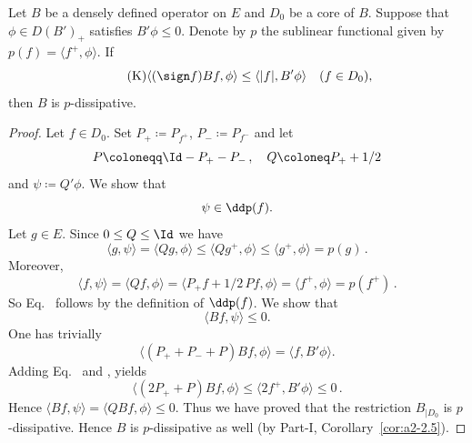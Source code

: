\begin{proposition}\label{prop:c2-3.10}
Let $B$ be a densely defined operator on $E$ and $D_{0}$ be a core of\/ $B$.
Suppose that $\phi \in D(B')_{+}$ satisfies $B'\phi \leq 0$.
Denote by $p$ the sublinear functional given by $p(f) = \langle f^{+},\phi \rangle$. 
If
\begin{equation*}\label{eq:c2-K6} \tag{K}
	\langle(\sign f) Bf,\phi \rangle \leq \langle|f|,B'\phi\rangle \quad (f \in D_{0}),
\end{equation*}
then $B$ is $p$-dissipative.
\end{proposition}
\begin{proof}
Let $f \in D_{0}$. 
Set $P_{+} \coloneqq P_{f^{+}}$, $P_{-} \coloneqq P_{f^{-}}$ and let
\[
P \coloneqq \Id - P_{+} - P_{-}\,, \quad Q \coloneq P_{+} + 1/2
\]
and $\psi \coloneq Q'\phi$. We show that
\begin{equation}\label{eq:c2-3.2}
\psi \in \ddp(f).
\end{equation}
Let $g \in E$. 
Since $0 \leq Q \leq \Id$ we have 
\[
\langle g,\psi \rangle = \langle Qg,\phi \rangle \leq \langle Qg^{+},\phi \rangle \leq
\langle g^{+},\phi \rangle = p(g)\,.
\]
Moreover, 
\[\langle f, \psi \rangle = \langle Qf,\phi \rangle = \langle P_{+}f + 1/2 \, Pf,\phi \rangle = \langle f^{+},\phi \rangle = p(f^{+})\,.
\]
So Eq.~ follows by the definition of\/ $\ddp(f)$. 
We show that
\begin{equation}\label{eq:c2-3.3}
\langle Bf,\psi \rangle \leq 0.
\end{equation}
One has trivially
\begin{equation}\label{eq:c2-3.4}
\langle(P_{+} + P_{-} + P) Bf,\phi \rangle = \langle f,B'\phi \rangle.
\end{equation}
Adding Eq.~ and ,  yields
\[
\langle(2P_{+} + P)Bf,\phi \rangle \leq \langle 2f^{+},B'\phi \rangle \leq 0\,.
\]
Hence $\langle Bf,\psi \rangle = \langle QBf,\phi \rangle \leq 0$.
Thus we have proved that the restriction  $B_{|D_{0}}$ is $p$-dissipative. 
Hence $B$ is $p$-dissipative as well (by Part-I, Corollary~\ref{cor:a2-2.5}).
\end{proof}

